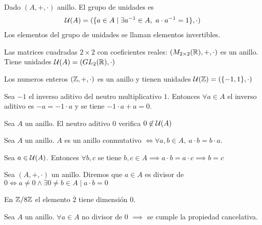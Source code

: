 \begin{dfn}
	Dado $(A, +, \cdot)$ anillo. El grupo de unidades es
	\begin{align}
		\mathcal{U}(A) = (\{a \in A \mid \exists a^{-1} \in A,\ a\cdot a^{-1} = 1\}, \cdot)
	\end{align}
	Los elementos del grupo de unidades se llaman elementos invertibles.
\end{dfn}

\begin{ej}
	Las matrices cuadradas $2\times 2$ con coeficientes reales: $(M_{2\times 2}(\mathbb{R}), +, \cdot)$ es un anillo. Tiene unidades $\mathcal{U}(A) = (GL_2(\mathbb{R}), \cdot)$
\end{ej}

\begin{ej}
	Los numeros enteros $(\mathbb{Z}, +, \cdot)$ es un anillo y tienen unidades $\mathcal{U}(\mathbb{Z}) = (\{-1, 1\}, \cdot)$
\end{ej}

\begin{pro}
	Sea $-1$ el inverso aditivo del neutro multiplicativo $1$. Entonces $\forall a \in A$ el inverso aditivo es $-a = -1 \cdot a$ y se tiene $-1\cdot a + a = 0$.
\end{pro}

\begin{pro}
	Sea $A$ un anillo. El neutro aditivo $0$ verifica $0 \not\in \mathcal{U}(A)$
\end{pro}

\begin{dfn}
	Sea $A$ un anillo. $A$ es un anillo conmutativo $\iff \forall a, b \in A,\ a\cdot b = b \cdot a$.
\end{dfn}

\begin{pro}
	Sea $a \in \mathcal{U}(A)$. Entonces $\forall b,c$ se tiene $b, c \in A \implies a\cdot b = a\cdot c \implies b = c$
\end{pro}

\begin{dfn}[Divisor de 0]
	Sea $(A, +, \cdot)$ un anillo. Diremos que $a \in A$ es divisor de $0 \iff a \neq 0 \land \exists 0 \neq b \in A \mid a\cdot b = 0$
\end{dfn}

\begin{ej}
	En $\mathbb{Z}/8\mathbb{Z}$ el elemento $\overline{2}$ tiene dimensión 0.
\end{ej}

\begin{pro}
	Sea $A$ un anillo. $\forall a \in A$ no divisor de 0 $\implies$ se cumple la propiedad cancelativa.
\end{pro}

